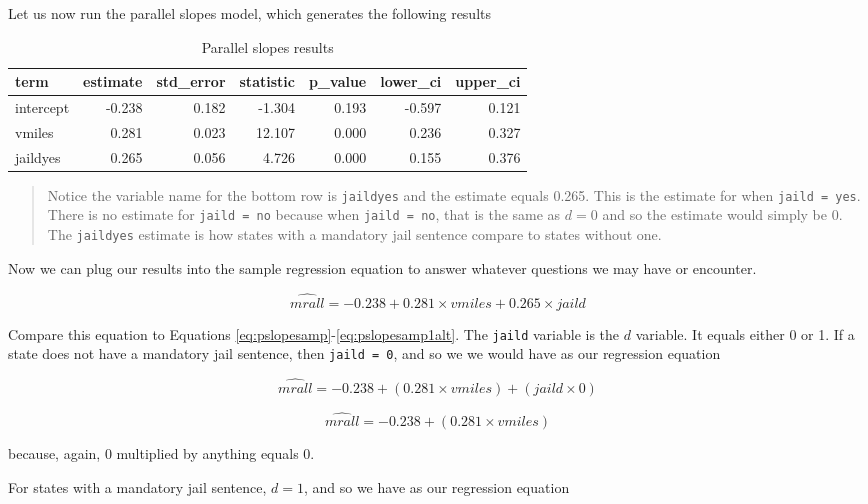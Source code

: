 \documentclass[
]{book}
\begin{document}
Let us now run the parallel slopes model, which generates the following results

\begin{table}

\caption{\label{tab:psloperesults}Parallel slopes results}
\centering
\begin{tabular}[t]{l|r|r|r|r|r|r}
\hline
term & estimate & std\_error & statistic & p\_value & lower\_ci & upper\_ci\\
\hline
intercept & -0.238 & 0.182 & -1.304 & 0.193 & -0.597 & 0.121\\
\hline
vmiles & 0.281 & 0.023 & 12.107 & 0.000 & 0.236 & 0.327\\
\hline
jaildyes & 0.265 & 0.056 & 4.726 & 0.000 & 0.155 & 0.376\\
\hline
\end{tabular}
\end{table}

\begin{quote}
Notice the variable name for the bottom row is \texttt{jaildyes} and the estimate equals 0.265. This is the estimate for when \texttt{jaild\ =\ yes}. There is no estimate for \texttt{jaild\ =\ no} because when \texttt{jaild\ =\ no}, that is the same as \(d=0\) and so the estimate would simply be 0. The \texttt{jaildyes} estimate is how states with a mandatory jail sentence compare to states without one.
\end{quote}

Now we can plug our results into the sample regression equation to answer whatever questions we may have or encounter.

\begin{equation}
\hat{mrall} = -0.238 + 0.281\times vmiles + 0.265 \times jaild
\end{equation}

Compare this equation to Equations \eqref{eq:pslopesamp}-\eqref{eq:pslopesamp1alt}. The \texttt{jaild} variable is the \(d\) variable. It equals either 0 or 1. If a state does not have a mandatory jail sentence, then \texttt{jaild\ =\ 0}, and so we we would have as our regression equation

\[\hat{mrall} = -0.238 + (0.281\times vmiles) + (jaild \times 0)\]

\[\hat{mrall} = -0.238 + (0.281\times vmiles)\]

because, again, 0 multiplied by anything equals 0.

For states with a mandatory jail sentence, \(d=1\), and so we have as our regression equation
\end{document}
